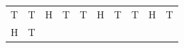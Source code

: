{\begin{tabular}[t]{|l|l|l|l|l|l|l|l|l|l|}
        T &
        T &
        H &
        T &
        T &
        H &
        T &
        T &
        H &
        T%
     \tabularnewline\cline{1-1}\cline{2-2}\cline{3-3}\cline{4-4}\cline{5-5}\cline{6-6}\cline{7-7}\cline{8-8}\cline{9-9}\cline{10-10}
        H &
        T &

\end{tabular}}
